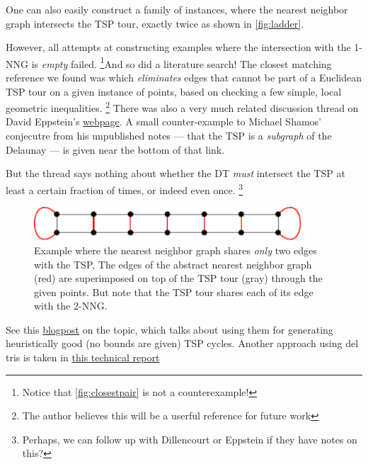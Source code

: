 \begin{description}
     One can also easily construct a family of instances, where the nearest neighbor graph intersects the TSP tour, exactly twice as shown in \autoref{fig:ladder}. 

     However, all attempts at constructing examples where the intersection with the 1-NNG is \textit{empty} failed. \footnote{Notice that \autoref{fig:closestpair} is not a counterexample!}And so did a
     literature search! The closest matching reference we found was \cite{hougardy2014edge} which \textit{eliminates} edges 
     that cannot be part of a Euclidean TSP tour on a given instance of points, based on checking a few simple, local geometric inequalities. \footnote{The author believes this will be a userful reference for future work}
     There was also a very much related discussion thread on David Eppstein's \href{https://www.ics.uci.edu/~eppstein/junkyard/dt-not-tsp.html}{webpage}. 
     A small counter-example to Michael Shamos' conjecutre from his unpublished notes --- that the TSP is a \textit{subgraph} of the Delaunay --- is given near the bottom of that link. 
      
     But the thread says nothing about whether the DT \textit{must} intersect the TSP at least a certain fraction of times, or indeed even once. \footnote{Perhaps, we can follow up with Dillencourt or Eppstein if they have notes on this?}
    
      \begin{figure}[H]
       \centering
       \includegraphics[width=10cm]{asytikz/ladder.pdf}
       \caption{\label{fig:ladder} Example where the nearest neighbor graph shares \textit{only} two edges with the TSP, The edges of the abstract nearest neighbor graph (red) are superimposed on top of the TSP tour (gray) through the given points. But note that the TSP tour shares each of its edge with the 2-NNG. }
     \end{figure}

     See this \href{https://web.colby.edu/thegeometricviewpoint/2015/03/09/delauney-triangulations-and-the-traveling-salesman/}{blogpost} on the topic, which 
     talks about using them for generating heuristically good (no bounds are given) TSP cycles. Another approach using del tris
     is taken in \href{https://www.researchgate.net/publication/215753374_An_On_log_n_Heuristic_for_the_Euclidean_Traveling_Salesman_Problem}{this technical report} 


\end{description}
